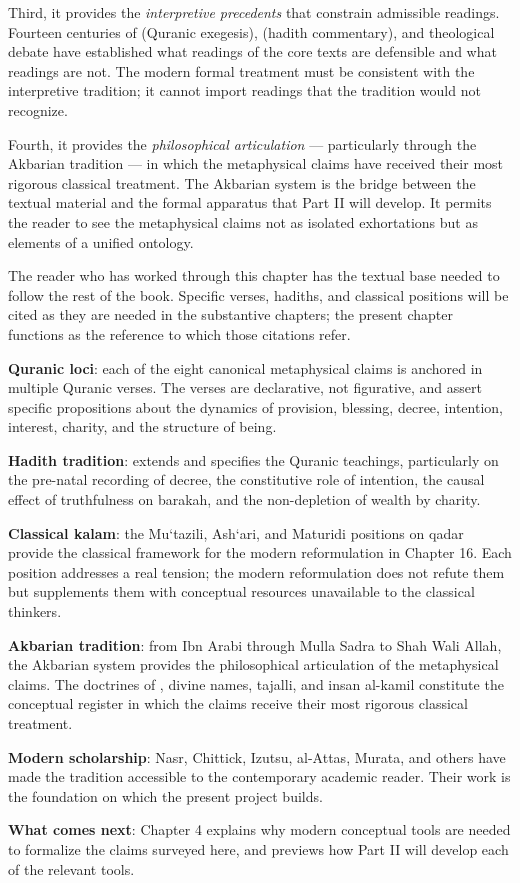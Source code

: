 Third, it provides the \emph{interpretive precedents} that constrain
admissible readings. Fourteen centuries of  (Quranic
exegesis),  (hadith commentary), and theological
debate have established what readings of the core texts are
defensible and what readings are not. The modern formal treatment
must be consistent with the interpretive tradition; it cannot
import readings that the tradition would not recognize.

Fourth, it provides the \emph{philosophical articulation} ---
particularly through the Akbarian tradition --- in which the
metaphysical claims have received their most rigorous classical
treatment. The Akbarian system is the bridge between the textual
material and the formal apparatus that Part II will develop. It
permits the reader to see the metaphysical claims not as isolated
exhortations but as elements of a unified ontology.

The reader who has worked through this chapter has the textual base
needed to follow the rest of the book. Specific verses, hadiths, and
classical positions will be cited as they are needed in the
substantive chapters; the present chapter functions as the reference
to which those citations refer.

\begin{summarybox}
\textbf{Quranic loci}: each of the eight canonical metaphysical
claims is anchored in multiple Quranic verses. The verses are
declarative, not figurative, and assert specific propositions about
the dynamics of provision, blessing, decree, intention, interest,
charity, and the structure of being.

\textbf{Hadith tradition}: extends and specifies the Quranic
teachings, particularly on the pre-natal recording of decree, the
constitutive role of intention, the causal effect of truthfulness on
barakah, and the non-depletion of wealth by charity.

\textbf{Classical kalam}: the Mu`tazili, Ash`ari, and Maturidi
positions on qadar provide the classical framework for the modern
reformulation in Chapter 16. Each position addresses a real tension;
the modern reformulation does not refute them but supplements them
with conceptual resources unavailable to the classical thinkers.

\textbf{Akbarian tradition}: from Ibn Arabi through Mulla Sadra to
Shah Wali Allah, the Akbarian system provides the philosophical
articulation of the metaphysical claims. The doctrines of
, divine names, tajalli, and insan al-kamil
constitute the conceptual register in which the claims receive
their most rigorous classical treatment.

\textbf{Modern scholarship}: Nasr, Chittick, Izutsu, al-Attas,
Murata, and others have made the tradition accessible to the
contemporary academic reader. Their work is the foundation on which
the present project builds.

\textbf{What comes next}: Chapter 4 explains why modern conceptual
tools are needed to formalize the claims surveyed here, and previews
how Part II will develop each of the relevant tools.
\end{summarybox}

\cleardoublepage
